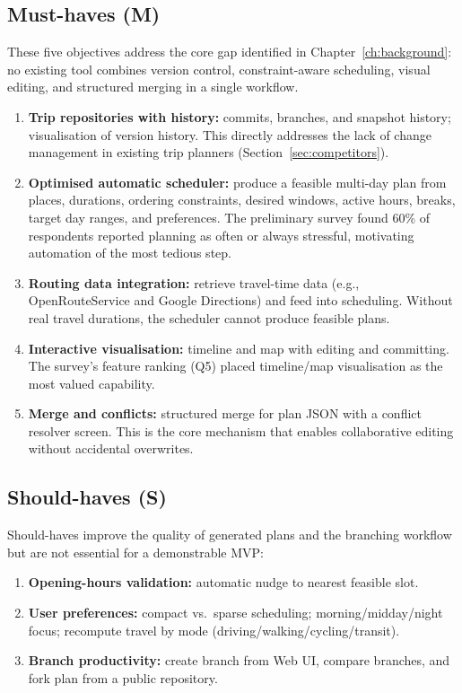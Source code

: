 \subsection*{Must-haves (M)}
These five objectives address the core gap identified in Chapter~\ref{ch:background}: no existing tool combines version control, constraint-aware scheduling, visual editing, and structured merging in a single workflow.
\begin{enumerate}[label=\textbf{M\arabic*}]
  \item \textbf{Trip repositories with history:} commits, branches, and snapshot history; visualisation of version history. This directly addresses the lack of change management in existing trip planners (Section~\ref{sec:competitors}).
  \item \textbf{Optimised automatic scheduler:} produce a feasible multi-day plan from places, durations, ordering constraints, desired windows, active hours, breaks, target day ranges, and preferences. The preliminary survey found 60\% of respondents reported planning as often or always stressful, motivating automation of the most tedious step.
  \item \textbf{Routing data integration:} retrieve travel-time data (e.g., OpenRouteService and Google Directions) and feed into scheduling. Without real travel durations, the scheduler cannot produce feasible plans.
  \item \textbf{Interactive visualisation:} timeline and map with editing and committing. The survey's feature ranking (Q5) placed timeline/map visualisation as the most valued capability.
  \item \textbf{Merge and conflicts:} structured merge for plan JSON with a conflict resolver screen. This is the core mechanism that enables collaborative editing without accidental overwrites.
\end{enumerate}

\subsection*{Should-haves (S)}
Should-haves improve the quality of generated plans and the branching workflow but are not essential for a demonstrable MVP:
\begin{enumerate}[label=\textbf{S\arabic*}]
  \item \textbf{Opening-hours validation:} automatic nudge to nearest feasible slot.
  \item \textbf{User preferences:} compact vs.\ sparse scheduling; morning/midday/night focus; recompute travel by mode (driving/walking/cycling/transit).
  \item \textbf{Branch productivity:} create branch from Web UI, compare branches, and fork plan from a public repository.
\end{enumerate}

